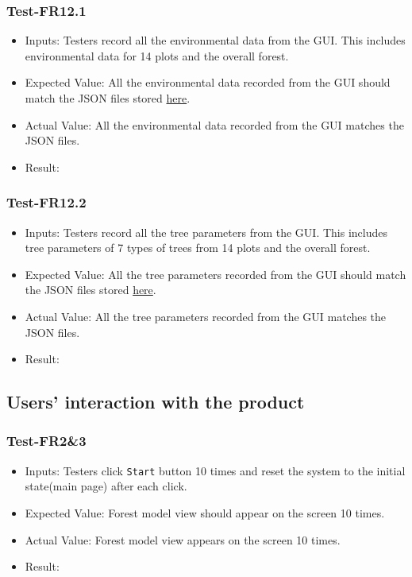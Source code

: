 \documentclass[12pt, titlepage]{article}
\begin{document}
\subsubsection{Test-FR12.1}
\begin{itemize}
    \item Inputs: Testers record all the environmental data from
    the GUI. This includes environmental data for 14 plots and the overall 
    forest. 
    \item Expected Value: All the environmental data recorded from the
    GUI should match the JSON files stored 
    \href{https://github.com/tingyushi/DTForest-DS}{here}.
    \item Actual Value: All the environmental data recorded from the
    GUI matches the JSON files.
    \item Result: \pass
\end{itemize}

\subsubsection{Test-FR12.2}
\begin{itemize}
    \item Inputs: Testers record all the tree parameters from
    the GUI. This includes tree parameters of 7 types of trees from  14
    plots and the overall forest. 
    \item Expected Value: All the tree parameters recorded from the
    GUI should match the JSON files stored 
    \href{https://github.com/tingyushi/DTForest-DS}{here}.
    \item Actual Value: All the tree parameters recorded from the
    GUI matches the JSON files.
    \item Result: \pass
\end{itemize}

\subsection{Users' interaction with the product}
\subsubsection{Test-FR2\&3}
\begin{itemize}
    \item Inputs: Testers click \verb|Start| button 10 times and reset the system
    to the initial state(main page) after each click. 
    \item Expected Value: Forest model view should appear on the screen 10 times.
    \item Actual Value: Forest model view appears on the screen 10 times.
    \item Result: \pass
\end{itemize}
\end{document}
